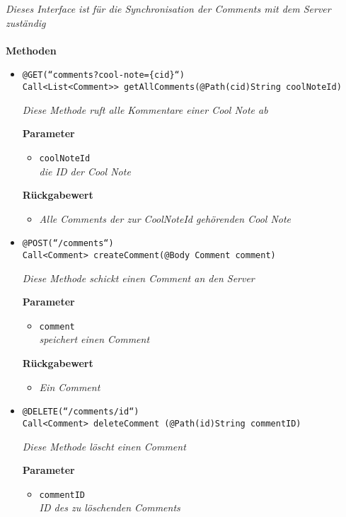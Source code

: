 		\textit{Dieses Interface ist für die Synchronisation der Comments mit dem Server zuständig}\\
\\
	\textbf{Methoden} 
		\begin{itemize}
		\item\texttt{{@GET(``comments?cool-note=\{cid\}``)\\ Call<List<Comment>{}> getAllComments(@Path(\grqq cid\grqq)String coolNoteId)}}

		\textit{Diese Methode ruft alle Kommentare einer Cool Note ab}

		\textbf{Parameter} 
		\begin{itemize}
			\item\texttt{coolNoteId}\\
		 	\textit{die ID der Cool Note}
	 	\end{itemize}

		\textbf{Rückgabewert} 
		\begin{itemize}
			\item\textit{Alle Comments der zur CoolNoteId gehörenden Cool Note}
	 	\end{itemize}


      \item\texttt{{@POST(``/comments``)
\\ Call<Comment> createComment(@Body Comment comment)}}

		\textit{Diese Methode schickt einen Comment an den Server }

		\textbf{Parameter} 
			\begin{itemize}
				\item\texttt{comment}\\
		 		\textit{speichert einen Comment}
	 		\end{itemize}


		\textbf{Rückgabewert} 
		\begin{itemize}
			\item\textit{Ein Comment}
	 	\end{itemize}
		

	 \item\texttt{{@DELETE(``/comments/{id}``)\\ Call<Comment> deleteComment (@Path(\grqq id\grqq)String commentID)}}

		\textit{Diese Methode löscht einen Comment }
		
		\textbf{Parameter} 
			\begin{itemize}
				\item\texttt{commentID}\\
		 		\textit{ID des zu löschenden Comments}
	 		\end{itemize}

	 \end{itemize}



